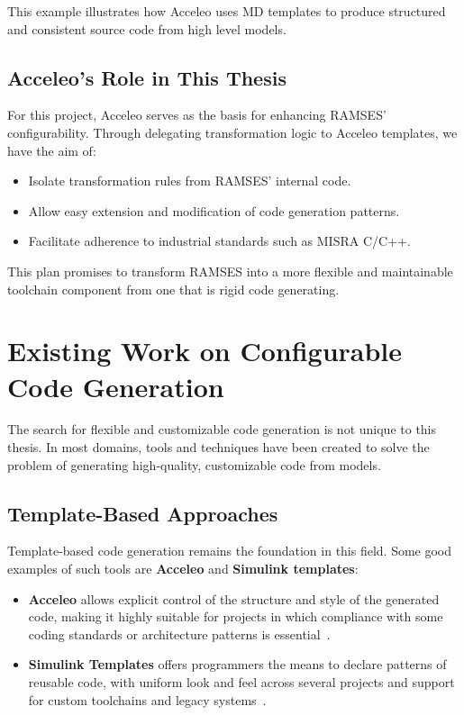 This example illustrates how Acceleo uses \gls{MD} templates to produce structured and consistent source code from high level models.

\subsection*{Acceleo’s Role in This Thesis}

For this project, Acceleo serves as the basis for enhancing \gls{RAMSES}' configurability. Through delegating transformation logic to Acceleo templates, we have the aim of: 
\begin{itemize} 
	\item Isolate transformation rules from \gls{RAMSES}' internal code.
	\item Allow easy extension and modification of code generation patterns.
	\item Facilitate adherence to industrial standards such as \gls{MISRA} C/C++.
\end{itemize}

This plan promises to transform \gls{RAMSES} into a more flexible and maintainable toolchain component from one that is rigid code generating.


\section{Existing Work on Configurable Code Generation} \label{sec:configurable_generation}

The search for flexible and customizable code generation is not unique to this thesis. In most domains, tools and techniques have been created to solve the problem of generating high-quality, customizable code from models.

\subsection*{Template-Based Approaches}

Template-based code generation remains the foundation in this field. Some good examples of such tools are \textbf{Acceleo} and \textbf{Simulink templates}: 

\begin{itemize} 
	\item \textbf{Acceleo} allows explicit control of the structure and style of the generated code, making it highly suitable for projects in which compliance with some coding standards or architecture patterns is essential~\cite{AcceleoUserGuide}. 
	\item \textbf{Simulink Templates} offers programmers the means to declare patterns of reusable code, with uniform look and feel across several projects and support for custom toolchains and legacy systems~\cite{simulink_templates}.
\end{itemize}

